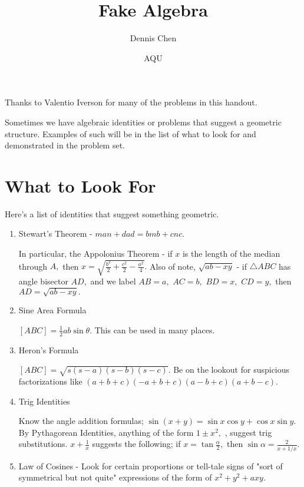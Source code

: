 \documentclass{article}
\title{Fake Algebra}
\author{Dennis Chen}
\date{AQU}
\begin{document}
\maketitle
Thanks to Valentio Iverson for many of the problems in this handout.

Sometimes we have algebraic identities or problems that suggest a geometric structure. Examples of such will be in the list of what to look for and demonstrated in the problem set.

\section{What to Look For}
Here's a list of identities that suggest something geometric.
\begin{enumerate}
    \item Stewart's Theorem - $man+dad=bmb+cnc.$
    \begin{itemize}
    \Item In particular, the Appolonius Theorem - if $x$ is the length of the median through $A,$ then $x=\sqrt{\frac{b^2}{2}+\frac{c^2}{2}-\frac{a^2}{4}}.$
    \Item Also of note, $\sqrt{ab-xy}$ - if $\triangle ABC$ has angle bisector $AD,$ and we label $AB=a,$ $AC=b,$ $BD=x,$ $CD=y,$ then $AD=\sqrt{ab-xy}.$
    \end{itemize}
    \item Sine Area Formula
	\begin{itemize}
	\Item $[ABC]=\frac{1}{2}ab\sin \theta.$ This can be used in many places.
	\end{itemize}
    \item Heron's Formula
    \begin{itemize}
    \Item $[ABC]=\sqrt{s(s-a)(s-b)(s-c)}.$ Be on the lookout for suspicious factorizations like $(a+b+c)(-a+b+c)(a-b+c)(a+b-c).$
    \end{itemize}
    \item Trig Identities
    \begin{itemize}
	\Item Know the angle addition formulas; $\sin(x+y)=\sin x\cos y+\cos x\sin y.$
	\Item By Pythagorean Identities, anything of the form $1\pm x^2,$ , suggest trig substitutions.
    \Item $x+\frac{1}{x}$ suggests the following; if $x=\tan\frac{\alpha}{2},$ then $\sin \alpha = \frac{2}{x+1/x}.$
    \end{itemize}
    \item Law of Cosines - Look for certain proportions or tell-tale signs of "sort of symmetrical but not quite" expressions of the form of $x^2+y^2+axy.$
\end{enumerate}
\end{document}
